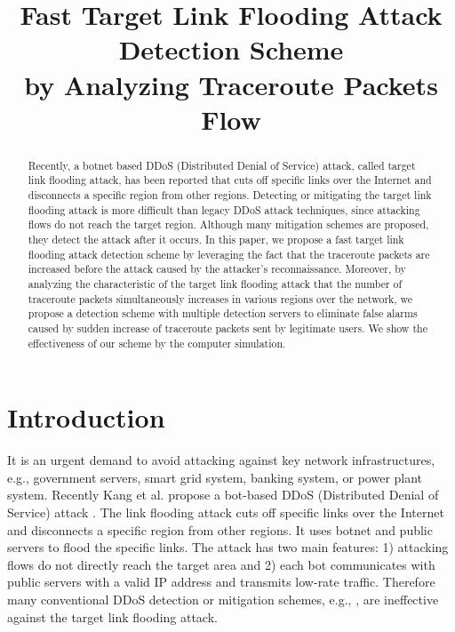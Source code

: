\documentclass[conference]{IEEEtran}
\begin{document}
  \title{Fast Target Link Flooding Attack Detection Scheme \\by Analyzing Traceroute Packets Flow}

  \author{
  }

  \maketitle

  \begin{abstract}
    Recently, a botnet based DDoS (Distributed Denial of Service) attack, called target link flooding attack, has been reported that cuts off specific links over the Internet and disconnects a specific region from other regions.
    Detecting or mitigating the target link flooding attack is more difficult than legacy DDoS attack techniques, since attacking flows do not reach the target region. 
    Although many mitigation schemes are proposed, they detect the attack after it occurs.
    In this paper, we propose a fast target link flooding attack detection scheme by leveraging the fact that the traceroute packets are increased before the attack caused by the attacker's reconnaissance.
    Moreover, by analyzing the characteristic of the target link flooding attack that the number of traceroute packets simultaneously increases in various regions over the network, we propose a detection scheme with multiple detection servers to eliminate false alarms caused by sudden increase of traceroute packets sent by legitimate users.
    We show the effectiveness of our scheme by the computer simulation.
  \end{abstract}

  \IEEEpeerreviewmaketitle

  \section{Introduction}\label{Sec:Introduction}
    It is an urgent demand to avoid attacking against key network infrastructures, e.g., government servers, smart grid system, banking system, or power plant system.
    Recently Kang et al. propose a bot-based DDoS (Distributed Denial of Service) attack \cite{Crossfire}. The link flooding attack cuts off specific links over the Internet and disconnects a specific region from other regions.
    It uses botnet and public servers to flood the specific links.
    The attack has two main features: 1) attacking flows do not directly reach the target area and 2) each bot communicates with public servers with a valid IP address and transmits low-rate traffic.
    Therefore many conventional DDoS detection or mitigation schemes, e.g., \cite{ddossurvey01, ddossurvey02}, are ineffective against the target link flooding attack.
\end{document}
